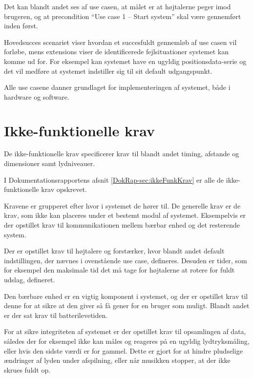 Det kan blandt andet ses af use casen, at målet er at højtalerne peger imod brugeren, og at precondition ``Use case 1 -- Start system'' skal være gennemført inden først.

Hovedsucces scenariet viser hvordan et succesfuldt gennemløb af use casen vil forløbe, mens extensions viser de identificerede fejlsituationer systemet kan komme ud for. For eksempel kan systemet have en ugyldig positionsdata-serie og det vil medføre at systemet indstiller sig til sit default udgangspunkt.

Alle use casene danner grundlaget for implementeringen af systemet, både i hardware og software.


\newpage
\section{Ikke-funktionelle krav}
De ikke-funktionelle krav specificerer krav til blandt andet timing, afstande og dimensioner samt lydniveauer. 

I Dokumentationsrapportens afsnit \vref{DokRap-sec:ikkeFunkKrav} er alle de ikke-funktionelle krav opskrevet.

Kravene er grupperet efter hvor i systemet de hører til. De generelle krav er de krav, som ikke kan placeres under et bestemt modul af systemet. Eksempelvis er der opstillet krav til kommunikationen mellem bærbar enhed og det resterende system.

Der er opstillet krav til højtalere og forstærker, hvor blandt andet default indstillingen, der nævnes i ovenstående use case, defineres.\newline
Desuden er tider, som for eksempel den maksimale tid det må tage for højtalerne at rotere for fuldt udslag, defineret.

Den bærbare enhed er en vigtig komponent i systemet, og der er opstillet krav til denne for at sikre at den giver så få gener for en bruger som muligt. Blandt andet er der sat krav til batterilevetiden.

For at sikre integriteten af systemet er der opstillet krav til opsamlingen af data, således der for eksempel ikke kan måles og reageres på en ugyldig lydtryksmåling, eller hvis den sidste værdi er for gammel. Dette er gjort for at hindre pludselige ændringer af lyden under afspilning, eller når musikken stopper, at der ikke skrues fuldt op.


